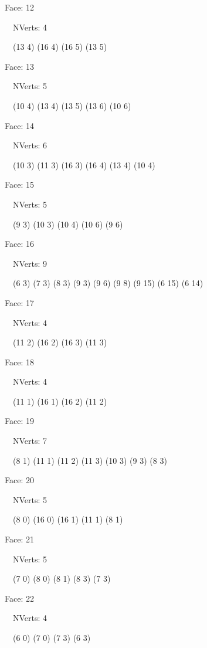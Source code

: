 \documentclass{article}
\begin{document}
{\footnotesize 

Face: 12

\   \    NVerts: 4

 \   \   (13 4) (16 4) (16 5) (13 5)}

{\footnotesize 

Face: 13

\   \    NVerts: 5

 \   \   (10 4) (13 4) (13 5) (13 6) (10 6)}

{\footnotesize 

Face: 14

\   \    NVerts: 6

 \   \   (10 3) (11 3) (16 3) (16 4) (13 4) (10 4)}

{\footnotesize 

Face: 15

\   \    NVerts: 5

 \   \   (9 3) (10 3) (10 4) (10 6) (9 6)}

{\footnotesize 

Face: 16

\   \    NVerts: 9

 \   \   (6 3) (7 3) (8 3) (9 3) (9 6) (9 8) (9 15) (6 15) (6 14)}

{\footnotesize 

Face: 17

\   \    NVerts: 4

 \   \   (11 2) (16 2) (16 3) (11 3)}

{\footnotesize 

Face: 18

\   \    NVerts: 4

 \   \   (11 1) (16 1) (16 2) (11 2)}

{\footnotesize 

Face: 19

\   \    NVerts: 7

 \   \   (8 1) (11 1) (11 2) (11 3) (10 3) (9 3) (8 3)}

{\footnotesize 

Face: 20

\   \    NVerts: 5

 \   \   (8 0) (16 0) (16 1) (11 1) (8 1)}

{\footnotesize 

Face: 21

\   \    NVerts: 5

 \   \   (7 0) (8 0) (8 1) (8 3) (7 3)}

{\footnotesize 

Face: 22

\   \    NVerts: 4

 \   \   (6 0) (7 0) (7 3) (6 3)}
\end{document}
